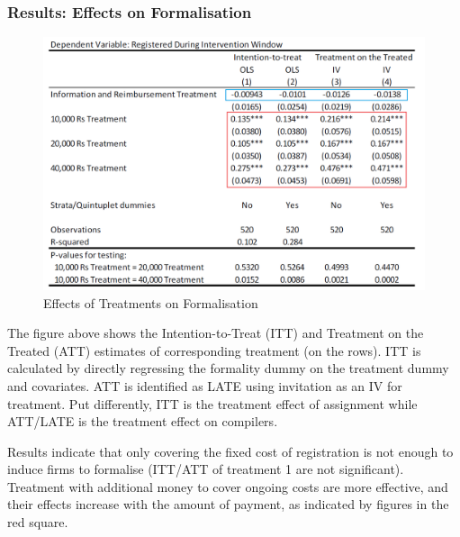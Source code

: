         \subsubsection{Results: Effects on Formalisation}
            \begin{figure}[H]
                \centering
                \includegraphics[width=5.5in]{images/ch5/SL formal treatment 2.png}
                \caption{Effects of Treatments on Formalisation}
            \end{figure}
            The figure above shows the Intention-to-Treat (ITT) and Treatment on the Treated (ATT) estimates of corresponding treatment (on the rows). ITT is calculated by directly regressing the formality dummy on the treatment dummy and covariates. ATT is identified as LATE using invitation as an IV for treatment. Put differently, ITT is the treatment effect of assignment while ATT/LATE is the treatment effect on compilers.

            Results indicate that only covering the fixed cost of registration is not enough to induce firms to formalise (ITT/ATT of treatment 1 are not significant). Treatment with additional money to cover ongoing costs are more effective, and their effects increase with the amount of payment, as indicated by figures in the red square.
            
